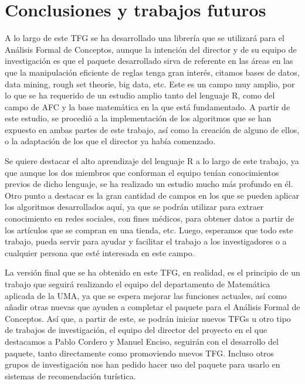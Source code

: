 \section{Conclusiones y trabajos futuros}

A lo largo de este TFG se ha desarrollado una librer\'ia que se utilizar\'a para el An\'alisis Formal de Conceptos, aunque la intenci\'on 
del director y de su equipo de investigaci\'on es que el paquete desarrollado sirva de referente en las \'areas en las que la manipulaci\'on 
eficiente de reglas tenga gran inter\'es, citamos bases de datos, data mining, rough set theorie, big data, etc. Este es un 
campo muy amplio, por lo que se ha requerido de un estudio amplio tanto del lenguaje R, como del campo de AFC y la base matem\'atica en la que 
est\'a fundamentado. A partir de este estudio, se procedi\'o a la implementaci\'on de los algoritmos que se han expuesto en ambas partes de 
este trabajo, as\'i como la creaci\'on de alguno de ellos, o la adaptaci\'on de los que el director ya hab\'ia comenzado.

Se quiere destacar el alto aprendizaje del lenguaje R a lo largo de este trabajo, ya que aunque los dos miembros que conforman el equipo ten\'ian 
conocimientos previos de dicho lenguaje, se ha realizado un estudio mucho m\'as profundo en \'el.
Otro punto a destacar es la gran cantidad de campos en los que se pueden aplicar los algoritmos desarrollados aqu\'i, ya que se podr\'an 
utilizar para extraer conocimiento en redes sociales, con fines m\'edicos, para obtener datos a partir de los art\'iculos que se compran 
en una tienda, etc. Luego, esperamos que todo este trabajo, pueda servir para ayudar y facilitar el trabajo a los investigadores o a cualquier persona 
que est\'e interesada en este campo.

La versi\'on final que se ha obtenido en este TFG, en realidad, es el principio de un trabajo que seguir\'a realizando el equipo del 
departamento de Matem\'atica aplicada de la UMA, ya que se espera mejorar las funciones actuales, as\'i como a\~nadir otras nuevas 
que ayuden a completar el paquete para el An\'alisis Formal de Conceptos. As\'i que, a partir de este, se podr\'an iniciar nuevos TFGs u otro 
tipo de trabajos de investigaci\'on, el equipo del director del proyecto en el que destacamos a Pablo Cordero y Manuel Enciso, seguir\'an 
con el desarrollo del paquete, tanto directamente como promoviendo nuevos TFG. Incluso otros grupos de investigaci\'on nos han pedido 
hacer uso del paquete para usarlo en sistemas de recomendaci\'on tur\'istica.

